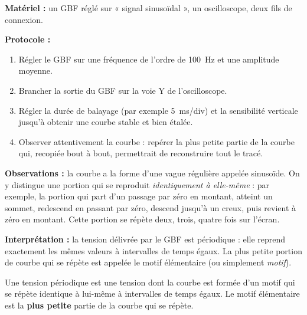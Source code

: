 \documentclass[11pt]{article}
\newcommand{\cle}[1]{{\popxbold\color{popdark}#1}}
\begin{document}
\begin{experience}
\textbf{Matériel :} un GBF réglé sur « signal sinusoïdal », un oscilloscope, deux fils de connexion.

\textbf{Protocole :}
\begin{enumerate}
\item Régler le GBF sur une fréquence de l'ordre de \SI{100}{Hz} et une amplitude moyenne.
\item Brancher la sortie du GBF sur la voie Y de l'oscilloscope.
\item Régler la durée de balayage (par exemple \SI{5}{ms/div}) et la sensibilité verticale jusqu'à obtenir une courbe stable et bien étalée.
\item Observer attentivement la courbe : repérer la plus petite partie de la courbe qui, recopiée bout à bout, permettrait de reconstruire tout le tracé.
\end{enumerate}

\textbf{Observations :} la courbe a la forme d'une vague régulière appelée \cle{sinusoïde}. On y distingue une portion qui se reproduit \emph{identiquement à elle-même} : par exemple, la portion qui part d'un passage par zéro en montant, atteint un sommet, redescend en passant par zéro, descend jusqu'à un creux, puis revient à zéro en montant. Cette portion se répète deux, trois, quatre fois sur l'écran.

\textbf{Interprétation :} la tension délivrée par le GBF est \cle{périodique} : elle reprend exactement les mêmes valeurs à intervalles de temps égaux. La plus petite portion de courbe qui se répète est appelée le \cle{motif élémentaire} (ou simplement \emph{motif}).
\end{experience}

\begin{aretenir}
Une tension périodique est une tension dont la courbe est formée d'un \cle{motif} qui se répète identique à lui-même à intervalles de temps égaux. Le motif élémentaire est la \textbf{plus petite} partie de la courbe qui se répète.
\end{aretenir}
\end{document}
